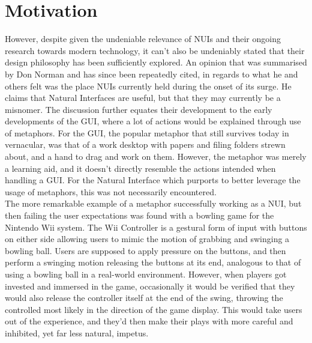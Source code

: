 \section{Motivation} \label{sec:intro_motivation}
    However, despite given the undeniable relevance of NUIs and their ongoing research towards modern technology, it can’t also be undeniably stated that their design philosophy has been sufficiently explored. An opinion that was summarised by Don Norman \cite{NormanNUI}\cite{NormanGIS} and has since been repeatedly cited, in regards to what he and others felt was the place NUIs currently held  during the onset of its surge. He claims that Natural Interfaces are useful, but that they may currently be a misnomer. The discussion further equates their development to the early developments of the GUI, where a lot of actions would be explained through use of metaphors. For the GUI, the popular metaphor that still survives today in vernacular, was that of a work desktop with papers and filing folders strewn about, and a hand to drag and work on them. However, the metaphor was merely a learning aid, and it doesn't directly resemble the actions intended when handling a GUI. For the Natural Interface which purports to better leverage the usage of metaphors, this was not necessarily encountered.\\
    The more remarkable example of a metaphor successfully working as a NUI, but then failing the user expectations was found with a bowling game for the Nintendo Wii system. The Wii Controller is a gestural form of input with buttons on either side allowing users to mimic the motion of grabbing and swinging a bowling ball. Users are supposed to apply pressure on the buttons, and then perform a swinging motion releasing the buttons at its end, analogous to that of using a bowling ball in a real-world environment. However, when players got invested and immersed in the game, occasionally it would be verified that they would also release the controller itself at the end of the swing, throwing the controlled most likely in the direction of the game display. This would take users out of the experience, and they'd then make their plays with more careful and inhibited, yet far less natural, impetus.\\
